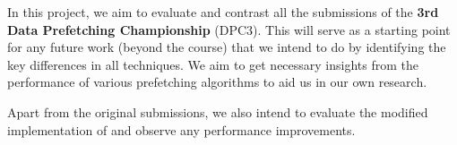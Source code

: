 

In this project, we aim to evaluate and contrast all the submissions of the \textbf{3rd Data Prefetching
Championship} (DPC3). This will serve as a starting point for any future work (beyond the course) that we intend to 
do by identifying the key differences in all techniques. We aim to get necessary insights from the 
performance of various prefetching algorithms to aid us in our own research.

Apart from the original submissions, we also intend to evaluate the modified implementation of \cite{sangam}
and observe any performance improvements.
